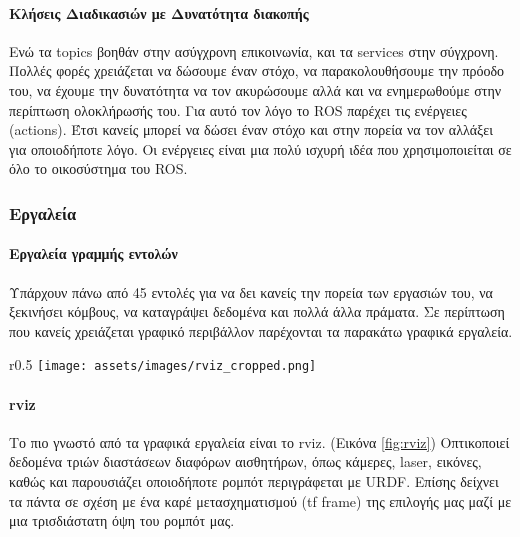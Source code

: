 \paragraph{Κλήσεις Διαδικασιών με Δυνατότητα διακοπής}
Ενώ τα topics βοηθάν στην ασύγχρονη επικοινωνία, και τα services στην σύγχρονη. Πολλές φορές χρειάζεται να δώσουμε έναν στόχο, να παρακολουθήσουμε την πρόοδο του, να έχουμε την δυνατότητα να τον ακυρώσουμε αλλά και να ενημερωθούμε στην περίπτωση ολοκλήρωσής του.
Για αυτό τον λόγο το ROS παρέχει τις ενέργειες (actions). Έτσι κανείς μπορεί να δώσει έναν στόχο και στην πορεία να τον αλλάξει για οποιοδήποτε λόγο. Οι ενέργειες είναι μια πολύ ισχυρή ιδέα που χρησιμοποιείται σε όλο το οικοσύστημα του ROS.  \\

\newpage
 
\subsubsection{Εργαλεία}

\paragraph{Εργαλεία γραμμής εντολών} 
Υπάρχουν πάνω από 45 εντολές για να δει κανείς την πορεία των εργασιών του, να ξεκινήσει κόμβους, να καταγράψει δεδομένα και πολλά άλλα πράματα. Σε περίπτωση που κανείς χρειάζεται γραφικό περιβάλλον παρέχονται τα παρακάτω γραφικά εργαλεία. \\

\begin{wrapfigure}{r}{0.5\textwidth}
	\centering
	\texttt{[image: assets/images/rviz\_cropped.png]}
	\caption{Γραφικό περιβάλλον rviz}
	\label{fig:rviz}
\end{wrapfigure}

	\paragraph{rviz}
	Το πιο γνωστό από τα γραφικά εργαλεία είναι το rviz. (Εικόνα \ref{fig:rviz}) Οπτικοποιεί δεδομένα τριών διαστάσεων διαφόρων αισθητήρων, όπως κάμερες, laser, εικόνες, καθώς και παρουσιάζει οποιοδήποτε ρομπότ περιγράφεται με URDF. Επίσης δείχνει τα πάντα σε σχέση με ένα καρέ μετασχηματισμού (tf frame) της επιλογής μας μαζί με μια τρισδιάστατη όψη του ρομπότ μας.

